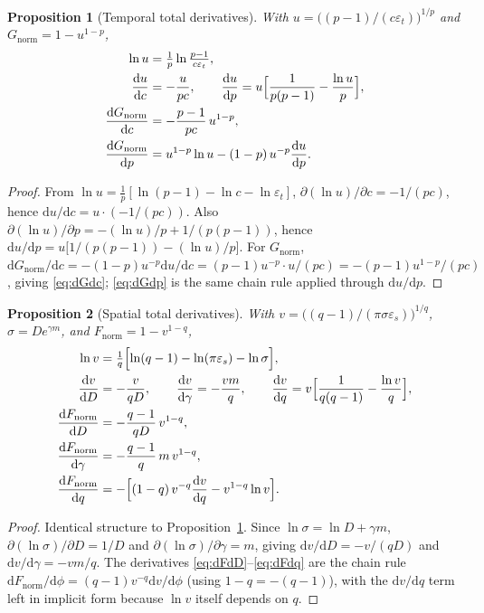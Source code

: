\documentclass[11pt,a4paper]{article}
\theoremstyle{plain}
\newtheorem{proposition}{Proposition}
\theoremstyle{definition}
\newcommand{\eps}{\varepsilon}
\newcommand{\Gnorm}{G_{\mathrm{norm}}}
\newcommand{\Fnorm}{F_{\mathrm{norm}}}
\newcommand{\dd}{\mathrm{d}}
\begin{document}
\begin{proposition}[Temporal total derivatives]\label{prop:t-grad}
With $u=\bigl((p-1)/(c\eps_t)\bigr)^{1/p}$ and $\Gnorm=1-u^{1-p}$,
\begin{align}
\ln u &= \tfrac{1}{p}\ln\tfrac{p-1}{c\eps_t},\\
\frac{\dd u}{\dd c} &= -\frac{u}{pc},\qquad
\frac{\dd u}{\dd p} = u\Bigl[\frac{1}{p(p-1)}-\frac{\ln u}{p}\Bigr],\\
\frac{\dd\Gnorm}{\dd c} &= -\frac{p-1}{pc}\,u^{1-p},\label{eq:dGdc}\\
\frac{\dd\Gnorm}{\dd p} &= u^{1-p}\ln u-(1-p)\,u^{-p}\frac{\dd u}{\dd p}.\label{eq:dGdp}
\end{align}
\end{proposition}
\begin{proof}
From $\ln u=\tfrac{1}{p}[\ln(p-1)-\ln c-\ln\eps_t]$,
$\partial(\ln u)/\partial c=-1/(pc)$, hence $\dd u/\dd c=u\cdot(-1/(pc))$.
Also $\partial(\ln u)/\partial p
= -(\ln u)/p + 1/(p(p-1))$, hence $\dd u/\dd p=u\bigl[1/(p(p-1))-(\ln u)/p\bigr]$.
For $\Gnorm$, $\dd\Gnorm/\dd c=-(1-p)u^{-p}\dd u/\dd c=(p-1)u^{-p}\cdot u/(pc)
=-(p-1)u^{1-p}/(pc)$, giving \eqref{eq:dGdc}; \eqref{eq:dGdp} is the same
chain rule applied through $\dd u/\dd p$.
\end{proof}

\begin{proposition}[Spatial total derivatives]\label{prop:s-grad}
With $v=\bigl((q-1)/(\pi\sigma\eps_s)\bigr)^{1/q}$,
$\sigma=D e^{\gamma m}$, and $\Fnorm=1-v^{1-q}$,
\begin{align}
\ln v &= \tfrac{1}{q}\Bigl[\ln(q-1)-\ln(\pi\eps_s)-\ln\sigma\Bigr],\\
\frac{\dd v}{\dd D} &= -\frac{v}{qD},\qquad
\frac{\dd v}{\dd\gamma} = -\frac{vm}{q},\qquad
\frac{\dd v}{\dd q} = v\Bigl[\frac{1}{q(q-1)}-\frac{\ln v}{q}\Bigr],\\
\frac{\dd\Fnorm}{\dd D} &= -\frac{q-1}{qD}\,v^{1-q},\label{eq:dFdD}\\
\frac{\dd\Fnorm}{\dd\gamma} &= -\frac{q-1}{q}\,m\,v^{1-q},\label{eq:dFdg}\\
\frac{\dd\Fnorm}{\dd q} &= -\Bigl[(1-q)\,v^{-q}\frac{\dd v}{\dd q}-v^{1-q}\ln v\Bigr].\label{eq:dFdq}
\end{align}
\end{proposition}
\begin{proof}
Identical structure to Proposition~\ref{prop:t-grad}. Since
$\ln\sigma=\ln D+\gamma m$, $\partial(\ln\sigma)/\partial D=1/D$ and
$\partial(\ln\sigma)/\partial\gamma=m$, giving $\dd v/\dd D=-v/(qD)$ and
$\dd v/\dd\gamma=-vm/q$. The derivatives \eqref{eq:dFdD}--\eqref{eq:dFdq} are
the chain rule $\dd\Fnorm/\dd\phi=(q-1)v^{-q}\dd v/\dd\phi$ (using
$1-q=-(q-1)$), with the $\dd v/\dd q$ term left in implicit form because
$\ln v$ itself depends on $q$.
\end{proof}
\end{document}
